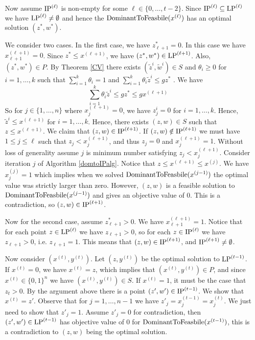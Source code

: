 \documentclass[runningheads]{llncs}
\begin{document}
	Now assume $\operatorname{IP}^{(\ell)}$ is non-empty for some $\ell \in \{0,\ldots,t-2\}$. Since $\operatorname{IP}^{(\ell)}\subseteq\operatorname{LP}^{(\ell)}$ we have $\operatorname{LP}^{(\ell)}\neq \emptyset$ and hence the $\operatorname{DominantToFeasbile}(x^{(\ell)})$ has an optimal solution $(z^*,w^*)$. 
	
	We consider two cases. In the first case, we have $z^*_{\ell+1}=0$. In this case we have $x^{(\ell+1)}_{\ell+1}=0$. Since $z^*\leq x^{(\ell+1)}$, we have $(z^*,w^*)\in \operatorname{LP}^{(\ell+1)}$. Also, $(z^*,w^*)\in P$. By Theorem \ref{CV} there exists $(\tilde{z}^i,\tilde{w}^i)\in S$ and $\theta_i\geq 0$ for $i=1,\ldots,k$ such that $\sum_{i=1}^{k} \theta_i = 1$ and  $\sum_{i=1}^{k}\theta_i \tilde{z}^i \leq gz^*$ . We have
	\begin{equation}
	\sum_{i=1}^{k}\theta_i \tilde{z}^i \leq gz^*\leq gx^{(\ell+1)}
	\end{equation}
	So for $j\in \{1,\ldots,n\}$ where $x^{(\ell+1)}_j=0$, we have $z^i_j=0$ for $i=1,\ldots,k$. Hence, $\tilde{z}^i\leq x^{(\ell+1)}$ for $i=1,\ldots,k$. Hence, there exists $(z,w)\in S$ such that $z\leq x^{(\ell+1)}$. We claim that $(z,w)\in \operatorname{IP}^{(\ell+1)}$. If $(z,w)\notin \operatorname{IP}^{(\ell+1)}$ we must have $1\leq j \leq \ell$ such that $z_j < x^{(\ell+1)}_{j}$, and thus $z_j = 0$ and $x^{(\ell+1)}_j=1$. Without loss of generality assume $j$ is minimum number satisfying $z_j < x^{(\ell+1)}_{j}$. Consider iteration $j$ of Algorithm \ref{domtoIPalg}. Notice that $z\leq x^{(\ell+1)}\leq x^{(j)}$. We have $x^{(j)}_j=1$ which implies when we solved $\operatorname{DominantToFeasbile}(x^{(j-1)})$ the optimal value was strictly larger than zero. However, $(z,w)$ is a feasible solution to $\operatorname{DominantToFeasbile}(x^{(j-1)})$ and gives an objective value of 0. This is a contradiction, so $(z,w)\in \operatorname{IP}^{(\ell+1)}$.
	
	Now for the second case, assume $z^*_{\ell+1} > 0$. We have $x^{(\ell+1)}_{\ell+1}=1$. Notice that for each point $z\in \operatorname{LP}^{(\ell)}$ we have $z_{\ell+1} >0$, so for each $z\in \operatorname{IP}^{(\ell)}$ we have $z_{\ell+1}>0$, i.e. $z_{\ell+1}=1$. This means that $(z,w)\in \operatorname{IP}^{(\ell+1)}$, and $\operatorname{IP}^{(\ell+1)} \neq \emptyset$.
	
	Now consider $(x^{(t)},y^{(t)})$. Let $(z,y^{(t)})$ be the optimal solution to $\operatorname{LP}^{(t-1)}$. If $x^{(t)} = 0$, we have $x^{(t)} = z$, which implies that $(x^{(t)},y^{(t)})\in P$, and since $x^{(t)}\in \{0,1\}^n$ we have $(x^{(t)},y^{(t)})\in S$. If $x^{(t)} =1$, it must be the case that $z_t > 0$. By the argument above there is a point $(z',w')\in \operatorname{IP}^{(t-1)}$. We show that $x^{(t)} = z'$. Observe that for $j=1,\ldots,n-1$ we have $z'_j= x_j^{(t-1)}=x_j^{(t)}$. We just need to show that $z'_j = 1$. Assume $z'_j = 0$ for contradiction, then $(z',w')\in \operatorname{LP}^{(t-1)}$ has objective value of $0$ for $\operatorname{DominantToFeasbile}(x^{(t-1)})$, this is a contradiction to $(z,w)$ being the optimal solution.
\end{document}
